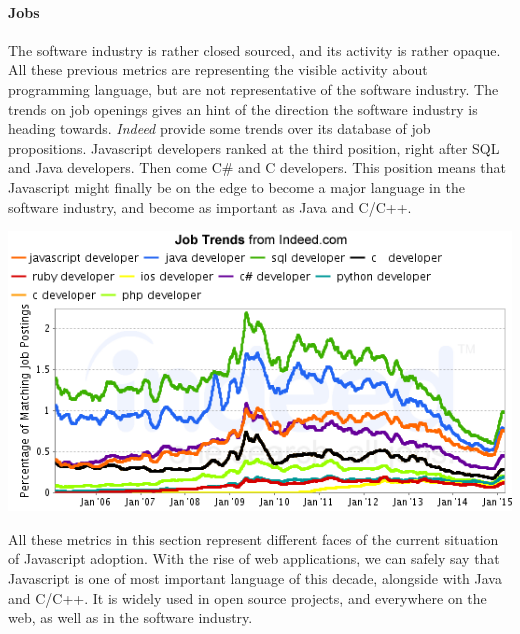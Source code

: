 

\paragraph{Jobs}

The software industry is rather closed sourced, and its activity is rather opaque.
All these previous metrics are representing the visible activity about programming language, but are not representative of the software industry.
The trends on job openings gives an hint of the direction the software industry is heading towards.
\textit{Indeed} provide some trends over its database of job propositions.
Javascript developers ranked at the third position, right after SQL and Java developers.
Then come C\# and C developers.
This position means that Javascript might finally be on the edge to become a major language in the software industry, and become as important as Java and C/C++.

\includegraphics[width=0.9\linewidth]{../../data/js-trends/jobgraph}



All these metrics in this section represent different faces of the current situation of Javascript adoption.
With the rise of web applications, we can safely say that Javascript is one of most important language of this decade, alongside with Java and C/C++.
It is widely used in open source projects, and everywhere on the web, as well as in the software industry.
